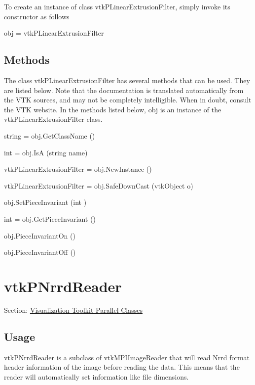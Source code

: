 To create an instance of class vtk\-P\-Linear\-Extrusion\-Filter, simply invoke its constructor as follows \begin{DoxyVerb}  obj = vtkPLinearExtrusionFilter
\end{DoxyVerb}
 \hypertarget{vtkwidgets_vtkxyplotwidget_Methods}{}\subsection{Methods}\label{vtkwidgets_vtkxyplotwidget_Methods}
The class vtk\-P\-Linear\-Extrusion\-Filter has several methods that can be used. They are listed below. Note that the documentation is translated automatically from the V\-T\-K sources, and may not be completely intelligible. When in doubt, consult the V\-T\-K website. In the methods listed below, {\ttfamily obj} is an instance of the vtk\-P\-Linear\-Extrusion\-Filter class. 
\begin{DoxyItemize}
\item {\ttfamily string = obj.\-Get\-Class\-Name ()}  
\item {\ttfamily int = obj.\-Is\-A (string name)}  
\item {\ttfamily vtk\-P\-Linear\-Extrusion\-Filter = obj.\-New\-Instance ()}  
\item {\ttfamily vtk\-P\-Linear\-Extrusion\-Filter = obj.\-Safe\-Down\-Cast (vtk\-Object o)}  
\item {\ttfamily obj.\-Set\-Piece\-Invariant (int )}  
\item {\ttfamily int = obj.\-Get\-Piece\-Invariant ()}  
\item {\ttfamily obj.\-Piece\-Invariant\-On ()}  
\item {\ttfamily obj.\-Piece\-Invariant\-Off ()}  
\end{DoxyItemize}\hypertarget{vtkparallel_vtkpnrrdreader}{}\section{vtk\-P\-Nrrd\-Reader}\label{vtkparallel_vtkpnrrdreader}
Section\-: \hyperlink{sec_vtkparallel}{Visualization Toolkit Parallel Classes} \hypertarget{vtkwidgets_vtkxyplotwidget_Usage}{}\subsection{Usage}\label{vtkwidgets_vtkxyplotwidget_Usage}
vtk\-P\-Nrrd\-Reader is a subclass of vtk\-M\-P\-I\-Image\-Reader that will read Nrrd format header information of the image before reading the data. This means that the reader will automatically set information like file dimensions.

